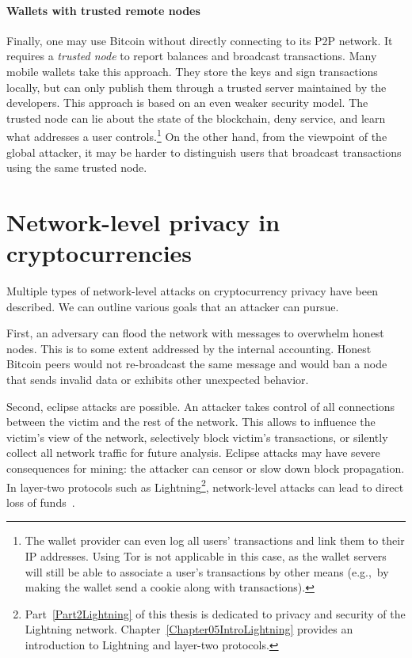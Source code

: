 \paragraph{Wallets with trusted remote nodes}
Finally, one may use Bitcoin without directly connecting to its P2P network.
It requires a \textit{trusted node} to report balances and broadcast transactions.
Many mobile wallets take this approach.
They store the keys and sign transactions locally, but can only publish them through a trusted server maintained by the developers.
This approach is based on an even weaker security model.
The trusted node can lie about the state of the blockchain, deny service, and learn what addresses a user controls.\footnote{The wallet provider can even log all users' transactions and link them to their IP addresses. Using Tor is not applicable in this case, as the wallet servers will still be able to associate a user's transactions by other means (e.g.,~by making the wallet send a cookie along with transactions).}
On the other hand, from the viewpoint of the global attacker, it may be harder to distinguish users that broadcast transactions using the same trusted node.



\section{Network-level privacy in cryptocurrencies}

Multiple types of network-level attacks on cryptocurrency privacy have been described.
We can outline various goals that an attacker can pursue.

First, an adversary can flood the network with messages to overwhelm honest nodes.
This is to some extent addressed by the internal accounting.
Honest Bitcoin peers would not re-broadcast the same message and would ban a node that sends invalid data or exhibits other unexpected behavior.

Second, eclipse attacks are possible.
An attacker takes control of all connections between the victim and the rest of the network.
This allows to influence the victim's view of the network, selectively block victim's transactions, or silently collect all network traffic for future analysis.
Eclipse attacks may have severe consequences for mining: the attacker can censor or slow down block propagation.
In layer-two protocols such as Lightning\footnote{Part~\ref{Part2Lightning} of this thesis is dedicated to privacy and security of the Lightning network. Chapter~\ref{Chapter05IntroLightning} provides an introduction to Lightning and layer-two protocols.}, network-level attacks can lead to direct loss of funds~\cite{Riard2020}.

